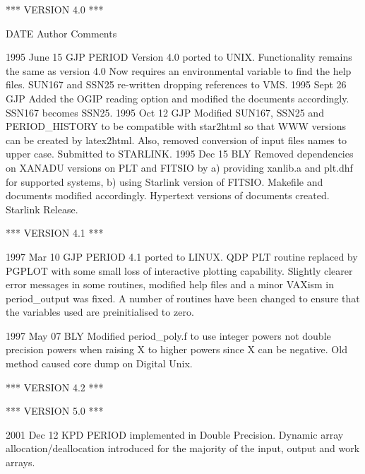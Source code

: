 \documentclass[twoside,11pt,noabs,nolof]{starlink}
\begin{document}
\begin{small}
\begin{terminalv}
                         *** VERSION 4.0 ***
\end{terminalv}
\end{small}

\newpage

\begin{small}
\begin{terminalv}
   DATE       Author            Comments

1995 June 15  GJP       PERIOD Version 4.0 ported to UNIX.
                        Functionality remains the same as version 4.0
                        Now requires an environmental variable to
                        find the help files. SUN167 and SSN25 re-written
                        dropping references to VMS.
1995 Sept 26  GJP       Added the OGIP reading option and modified
                        the documents accordingly. SSN167 becomes SSN25.
1995 Oct  12  GJP       Modified SUN167, SSN25 and PERIOD_HISTORY
                        to be compatible with star2html so that WWW
                        versions can be created by latex2html. Also,
                        removed conversion of input files names to upper
                        case. Submitted to STARLINK.
1995 Dec  15  BLY       Removed dependencies on XANADU versions on PLT and
                        FITSIO by a) providing xanlib.a and plt.dhf for
                        supported systems, b) using Starlink version of
                        FITSIO.  Makefile and documents modified accordingly.
                        Hypertext versions of documents created.
                        Starlink Release.

                        *** VERSION 4.1 ***

1997 Mar  10  GJP       PERIOD 4.1 ported to LINUX.
                        QDP PLT routine replaced by PGPLOT with some
                        small loss of interactive plotting capability.
                        Slightly clearer error messages in some routines,
                        modified help files and a minor VAXism in
                        period_output was fixed. A number of routines have
                        been changed to ensure that the variables used
                        are preinitialised to zero.

1997 May  07  BLY       Modified period_poly.f to use integer powers not
                        double precision powers when raising X to higher
                        powers since X can be negative.  Old method caused
                        core dump on Digital Unix.

                        *** VERSION 4.2 ***

                        *** VERSION 5.0 ***

2001 Dec  12  KPD       PERIOD implemented in Double Precision.
                        Dynamic array allocation/deallocation introduced
                        for the majority of the input, output and work
                        arrays.
\end{terminalv}
\end{small}
\end{document}
